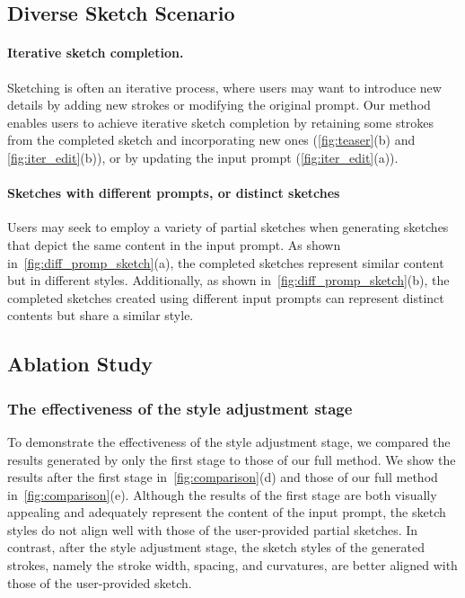 \subsection{Diverse Sketch Scenario}
\paragraph{Iterative sketch completion.}

Sketching is often an iterative process, where users may want to introduce new details by adding new strokes or modifying the original prompt.
Our method enables users to achieve iterative sketch completion by retaining some strokes from the completed sketch and incorporating new ones (\cref{fig:teaser}(b) and \cref{fig:iter_edit}(b)), or by updating the input prompt (\cref{fig:iter_edit}(a)).
\paragraph{Sketches with different prompts, or distinct sketches}
Users may seek to employ a variety of partial sketches when generating sketches that depict the same content in the input prompt.
As shown in~\cref{fig:diff_promp_sketch}(a), the completed sketches represent similar content but in different styles.
Additionally, as shown in~\cref{fig:diff_promp_sketch}(b), the completed sketches created using different input prompts can represent distinct contents but share a similar style.





\subsection{Ablation Study}
\subsubsection{The effectiveness of the style adjustment stage}
To demonstrate the effectiveness of the style adjustment stage, we compared the results generated by only the first stage to those of our full method.
We show the results after the first stage in~\cref{fig:comparison}(d) and those of our full method in~\cref{fig:comparison}(e).
Although the results of the first stage are both visually appealing and adequately represent the content of the input prompt, the sketch styles do not align well with those of the user-provided partial sketches.
In contrast, after the style adjustment stage, the sketch styles of the generated strokes, namely the stroke width, spacing, and curvatures, are better aligned with those of the user-provided sketch.

